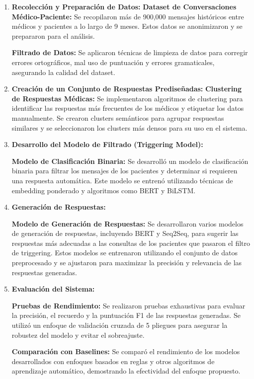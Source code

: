 		\begin{enumerate}
			
			\item \textbf{Recolección y Preparación de Datos:}
				\subitem \textbf{Dataset de Conversaciones Médico-Paciente:} Se recopilaron más de 900,000 mensajes históricos entre médicos y pacientes a lo largo de 9 meses. Estos datos se anonimizaron y se prepararon para el análisis.
				
				\subitem \textbf{Filtrado de Datos:} Se aplicaron técnicas de limpieza de datos para corregir errores ortográficos, mal uso de puntuación y errores gramaticales, asegurando la calidad del dataset.
			
			\item \textbf{Creación de un Conjunto de Respuestas Prediseñadas:}
				\subitem \textbf{Clustering de Respuestas Médicas:} Se implementaron algoritmos de clustering para identificar las respuestas más frecuentes de los médicos y etiquetar los datos manualmente. Se crearon clusters semánticos para agrupar respuestas similares y se seleccionaron los clusters más densos para su uso en el sistema.
			
			\item \textbf{Desarrollo del Modelo de Filtrado (Triggering Model):}
			
				\subitem \textbf{Modelo de Clasificación Binaria:} Se desarrolló un modelo de clasificación binaria para filtrar los mensajes de los pacientes y determinar si requieren una respuesta automática. Este modelo se entrenó utilizando técnicas de embedding ponderado y algoritmos como BERT y BiLSTM.
			
			
			\item \textbf{Generación de Respuestas:}
			
				\subitem \textbf{Modelo de Generación de Respuestas:} Se desarrollaron varios modelos de generación de respuestas, incluyendo BERT y Seq2Seq, para sugerir las respuestas más adecuadas a las consultas de los pacientes que pasaron el filtro de triggering. Estos modelos se entrenaron utilizando el conjunto de datos preprocesado y se ajustaron para maximizar la precisión y relevancia de las respuestas generadas.
			
			\item \textbf{Evaluación del Sistema:}
			
				\subitem \textbf{Pruebas de Rendimiento:} Se realizaron pruebas exhaustivas para evaluar la precisión, el recuerdo y la puntuación F1 de las respuestas generadas. Se utilizó un enfoque de validación cruzada de 5 pliegues para asegurar la robustez del modelo y evitar el sobreajuste.
				
				\subitem \textbf{Comparación con Baselines:} Se comparó el rendimiento de los modelos desarrollados con enfoques basados en reglas y otros algoritmos de aprendizaje automático, demostrando la efectividad del enfoque propuesto.
		\end{enumerate}
			
